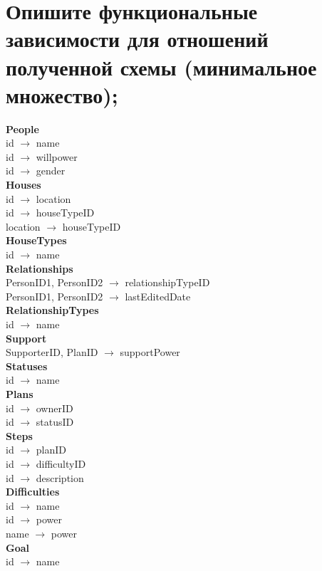 \documentclass[12pt,onecolumn]{article}
\begin{document}
\section{Опишите функциональные зависимости для отношений полученной схемы (минимальное множество);}
\begin{multicols}{2}
  \textbf{People}\\
  id $\to$ name\\
  id $\to$ willpower\\
  id $\to$ gender\\
  \textbf{Houses}\\
  id $\to$ location\\
  id $\to$ houseTypeID\\
  location $\to$ houseTypeID\\
  \textbf{HouseTypes}\\
  id $\to$ name\\
  \textbf{Relationships}\\
  PersonID1, PersonID2 $\to$ relationshipTypeID\\
  PersonID1, PersonID2 $\to$ lastEditedDate\\
  \textbf{RelationshipTypes}\\
  id $\to$ name\\
  \textbf{Support}\\
  SupporterID, PlanID $\to$ supportPower\\
  \textbf{Statuses}\\
  id $\to$ name\\
  \textbf{Plans}\\
  id $\to$ ownerID\\
  id $\to$ statusID\\
  \textbf{Steps}\\
  id $\to$ planID\\
  id $\to$ difficultyID\\
  id $\to$ description\\
  \textbf{Difficulties}\\
  id $\to$ name\\
  id $\to$ power\\
  name $\to$ power\\
  \textbf{Goal}\\
  id $\to$ name\\
\end{multicols}
\end{document}
